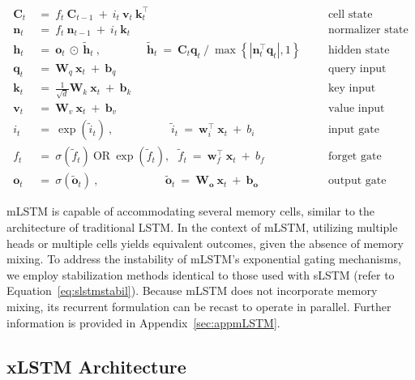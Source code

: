\begin{align}
\label{eq:mlstm_recurrent_begin}
\mathbf{C}_t \ &= \  f_t \ \mathbf{C}_{t-1} \ + \ 
  i_t \ \mathbf{v}_t \ \mathbf{k}_t^\top & &  &\text{cell state} \\
\mathbf{n}_t \ &= \  f_t \ \mathbf{n}_{t-1} \ + \ 
  i_t \ \mathbf{k}_t & &  &\text{normalizer state} \\
\mathbf{h}_t  \ &= \ \mathbf{o}_t \ \odot \ \tilde{\mathbf{h}}_t
\ , \qquad \qquad 
\tilde{\mathbf{h}}_t \ = \   \mathbf{C}_t \mathbf{q}_t \ / \ 
  \max \left\{ |\mathbf{n}_t^\top \mathbf{q}_t|, 1 \right\} 
   &&&\text{hidden state} \\
\mathbf{q}_t \ &= \ \mathbf{W}_q \ \mathbf{x}_t \ + \ \mathbf{b}_q  & &  &\text{query input} \\
\mathbf{k}_t \ &= \ \frac{1}{\sqrt{d}} \mathbf{W}_k \ \mathbf{x}_t \ + \ \mathbf{b}_k  & &  &\text{key input} \\
\mathbf{v}_t \ &= \ \mathbf{W}_v \ \mathbf{x}_t \ + \ \mathbf{b}_v  & &  &\text{value input} \\
i_t \ &= \ \!\exp \!  \! \left( \tilde{i}_t  \right) \ , 
 \qquad \qquad \ \ \ \ \,
  \tilde{i}_t \ = \ \mathbf{w}^\top_{i} \ \mathbf{x}_t \ + \  b_{i} \ \ \ 
  &&&\text{input gate} \\
f_t \ &= \ \sigma \!  \left(  \tilde{f}_t \right) \ \text{OR} \ \!\exp \!  \! \left(  \tilde{f}_t \right) , \ \ \: \!
\tilde{f}_t \ = \ \mathbf{w}^\top_{f} \ \mathbf{x}_t  \ + \
  b_{f}
  &&& \text{forget gate} \\
\label{eq:mlstm_recurrent_end}
\mathbf{o}_t \ &= \ \sigma \left( \tilde{\mathbf{o}}_t \right) \ , \qquad \qquad \quad \ \ \ \,
  \tilde{\mathbf{o}}_t  \ = \ \mathbf{W}_{\mathbf{o}} \ \mathbf{x}_t \ + \
  \mathbf{b}_{\mathbf{o}}
  &&&\text{output gate} 
\end{align}

mLSTM is capable of accommodating several memory cells, similar to the architecture of traditional LSTM. In the context of mLSTM, utilizing multiple heads or multiple cells yields equivalent outcomes, given the absence of memory mixing. To address the instability of mLSTM's exponential gating mechanisms, we employ stabilization methods identical to those used with sLSTM (refer to Equation~\ref{eq:slstmstabil}). 
Because mLSTM does not incorporate memory mixing, its recurrent formulation can be recast to operate in parallel. Further information is provided in Appendix~\ref{sec:appmLSTM}.

\subsection{xLSTM Architecture}
\label{sec:xLSTMarch}

